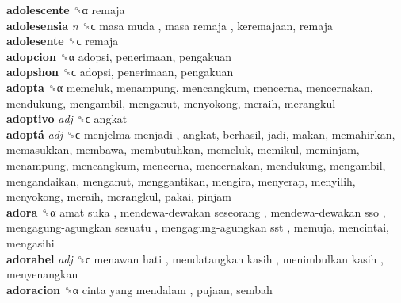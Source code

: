 \textbf{adolescente} ␝α  remaja  \\
\textbf{adolesensia} \emph{n}  ␝ϲ   masa muda ,  masa remaja , keremajaan, remaja  \\
\textbf{adolesente} ␝ϲ  remaja  \\
\textbf{adopcion} ␝α  adopsi, penerimaan, pengakuan  \\
\textbf{adopshon} ␝ϲ  adopsi, penerimaan, pengakuan  \\
\textbf{adopta} ␝α  memeluk, menampung, mencangkum, mencerna, mencernakan, mendukung, mengambil, menganut, menyokong, meraih, merangkul  \\
\textbf{adoptivo} \emph{adj}  ␝ϲ  angkat  \\
\textbf{adoptá} \emph{adj}  ␝ϲ   menjelma menjadi , angkat, berhasil, jadi, makan, memahirkan, memasukkan, membawa, membutuhkan, memeluk, memikul, meminjam, menampung, mencangkum, mencerna, mencernakan, mendukung, mengambil, mengandaikan, menganut, menggantikan, mengira, menyerap, menyilih, menyokong, meraih, merangkul, pakai, pinjam  \\
\textbf{adora} ␝α   amat suka ,  mendewa-dewakan seseorang ,  mendewa-dewakan sso ,  mengagung-agungkan sesuatu ,  mengagung-agungkan sst , memuja, mencintai, mengasihi  \\
\textbf{adorabel} \emph{adj}  ␝ϲ   menawan hati ,  mendatangkan kasih ,  menimbulkan kasih , menyenangkan  \\
\textbf{adoracion} ␝α   cinta yang mendalam , pujaan, sembah  \\
